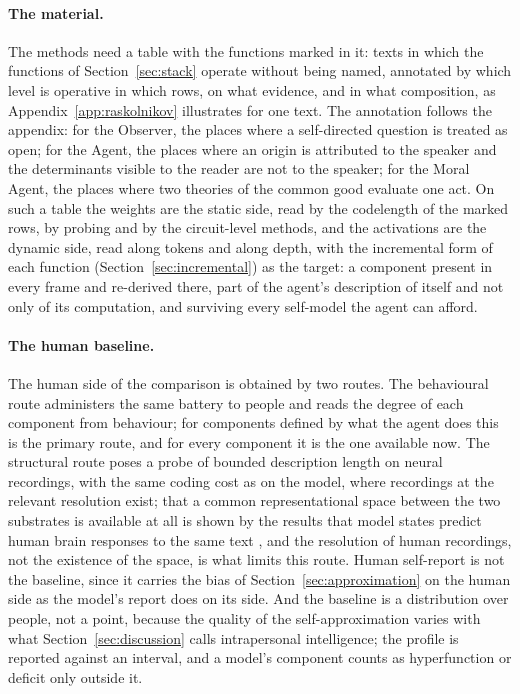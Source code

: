 \paragraph{The material.}
The methods need a table with the functions marked in it: texts in which the functions of
Section~\ref{sec:stack} operate without being named, annotated by which level is operative in which
rows, on what evidence, and in what composition, as Appendix~\ref{app:raskolnikov} illustrates for one
text. The annotation follows the appendix: for the Observer, the places where a self-directed question
is treated as open; for the Agent, the places where an origin is attributed to the speaker and the
determinants visible to the reader are not to the speaker; for the Moral Agent, the places where two
theories of the common good evaluate one act. On such a table the weights are the static side, read by
the codelength of the marked rows, by probing and by the circuit-level methods, and the activations
are the dynamic side, read along tokens and along depth, with the incremental form of each function
(Section~\ref{sec:incremental}) as the target: a component present in every frame and re-derived
there, part of the agent's description of itself and not only of its computation, and surviving every
self-model the agent can afford.

\paragraph{The human baseline.}
\label{sec:baseline}
The human side of the comparison is obtained by two routes. The behavioural route administers the same
battery to people and reads the degree of each component from behaviour; for components defined by
what the agent does this is the primary route, and for every component it is the one available now.
The structural route poses a probe of bounded description length on neural recordings, with the same
coding cost as on the model, where recordings at the relevant resolution exist; that a common
representational space between the two substrates is available at all is shown by the results that
model states predict human brain responses to the same text
\citep{schrimpf2021,goldstein2022,caucheteux2022}, and the resolution of human recordings, not the
existence of the space, is what limits this route. Human self-report is not the baseline, since it
carries the bias of Section~\ref{sec:approximation} on the human side as the model's report does on
its side. And the baseline is a distribution over people, not a point, because the quality of the
self-approximation varies with what Section~\ref{sec:discussion} calls intrapersonal intelligence; the
profile is reported against an interval, and a model's component counts as hyperfunction or deficit
only outside it.

